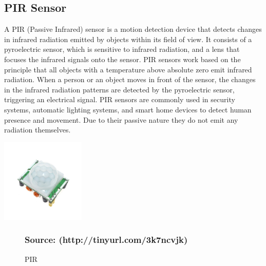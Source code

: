 \documentclass[12pt,a4paper]{report}
\begin{document}
	
	
	
	
	
	

	
	
	
	\subsection{PIR Sensor}
	\begin{justify}
		A PIR (Passive Infrared) sensor is a motion detection device that detects changes in infrared radiation emitted by objects within its field of view. It consists of a pyroelectric sensor, which is sensitive to infrared radiation, and a lens that focuses the infrared signals onto the sensor. PIR sensors work based on the principle that all objects with a temperature above absolute zero emit infrared radiation. When a person or an object moves in front of the sensor, the changes in the infrared radiation patterns are detected by the pyroelectric sensor, triggering an electrical signal. PIR sensors are commonly used in security systems, automatic lighting systems, and smart home devices to detect human presence and movement. Due to their passive nature they do not emit any radiation themselves. 
	\end{justify}
	
	\begin{center}
		
		\includegraphics[width=0.3\textwidth]{images//pir_sensor.jpg}
		
		
		\begin{figure}[ht]
			
			
			\caption{PIR}
			
			\subsubsection{Source: (http://tinyurl.com/3k7ncvjk)}
		\end{figure}
		
	\end{center}
	
\end{document}
